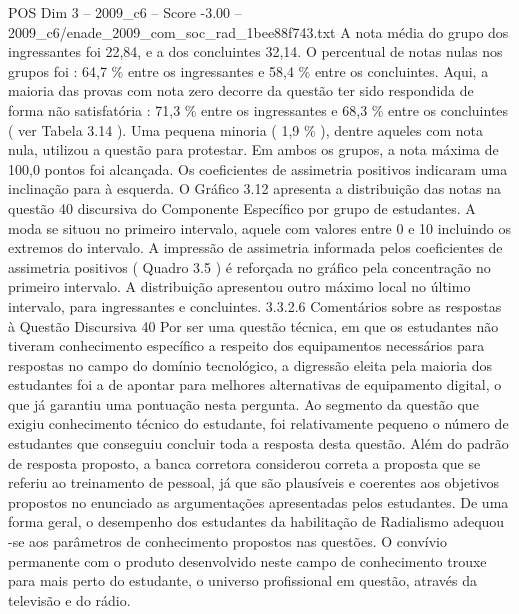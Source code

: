 \begin{textsample}{POS Dim 3 – 2009\_c6 – Score -3.00 – 2009\_c6/enade\_2009\_com\_soc\_rad\_1bee88f743.txt}
A nota média do grupo dos ingressantes foi 22,84, e a dos concluintes 32,14.
O percentual de notas nulas nos grupos foi : 64,7 \% entre os ingressantes e 58,4 \% entre os concluintes.
Aqui, a maioria das provas com nota zero decorre da questão ter sido respondida de forma não satisfatória : 71,3 \% entre os ingressantes e 68,3 \% entre os concluintes ( ver Tabela 3.14 ).
Uma pequena minoria ( 1,9 \% ), dentre aqueles com nota nula, utilizou a questão para protestar.
Em ambos os grupos, a nota máxima de 100,0 pontos foi alcançada.
Os coeficientes de assimetria positivos indicaram uma inclinação para à esquerda.
O Gráfico 3.12 apresenta a distribuição das notas na questão 40 discursiva do Componente Específico por grupo de estudantes.
A moda se situou no primeiro intervalo, aquele com valores entre 0 e 10 incluindo os extremos do intervalo.
A impressão de assimetria informada pelos coeficientes de assimetria positivos ( Quadro 3.5 ) é reforçada no gráfico pela concentração no primeiro intervalo.
A distribuição apresentou outro máximo local no último intervalo, para ingressantes e concluintes. 3.3.2.6 Comentários sobre as respostas à Questão Discursiva 40 Por ser uma questão técnica, em que os estudantes não tiveram conhecimento específico a respeito dos equipamentos necessários para respostas no campo do domínio tecnológico, a digressão eleita pela maioria dos estudantes foi a de apontar para melhores alternativas de equipamento digital, o que já garantiu uma pontuação nesta pergunta.
Ao segmento da questão que exigiu conhecimento técnico do estudante, foi relativamente pequeno o número de estudantes que conseguiu concluir toda a resposta desta questão.
Além do padrão de resposta proposto, a banca corretora considerou correta a proposta que se referiu ao treinamento de pessoal, já que são plausíveis e coerentes aos objetivos propostos no enunciado as argumentações apresentadas pelos estudantes.
De uma forma geral, o desempenho dos estudantes da habilitação de Radialismo adequou -se aos parâmetros de conhecimento propostos nas questões.
O convívio permanente com o produto desenvolvido neste campo de conhecimento trouxe para mais perto do estudante, o universo profissional em questão, através da televisão e do rádio.

\end{textsample}
